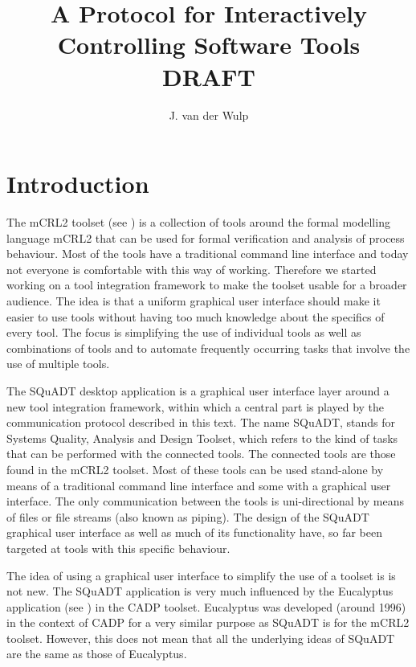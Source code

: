 \documentclass{article}
\title{A Protocol for Interactively Controlling Software Tools\\DRAFT}
\author{J. van der Wulp}
\newcommand{\squadt}{SQuADT\xspace}
\begin{document}
\maketitle
\thispagestyle{empty}

 \section{Introduction}

  The mCRL2 toolset (see \cite{groote_et_al:DSP:2007:862}) is a collection of
  tools around the formal modelling language mCRL2 that can be used for formal
  verification and analysis of process behaviour.  Most of the tools have a
  traditional command line interface and today not everyone is comfortable with
  this way of working.  Therefore we started working on a tool integration
  framework to make the toolset usable for a broader audience. The idea is that
  a uniform graphical user interface should make it easier to use tools without
  having too much knowledge about the specifics of every tool.  The focus is
  simplifying the use of individual tools as well as combinations of tools and
  to automate frequently occurring tasks that involve the use of multiple
  tools.
  
  The \squadt desktop application is a graphical user interface layer around a
  new tool integration framework, within which a central part is played by the
  communication protocol described in this text.  The name \squadt, stands for
  Systems Quality, Analysis and Design Toolset, which refers to the kind of
  tasks that can be performed with the connected tools. The connected tools are
  those found in the mCRL2 toolset. Most of these tools can be used
  stand-alone by means of a traditional command line interface and some with a
  graphical user interface.  The only communication between the tools is
  uni-directional by means of files or file streams (also known as piping). The
  design of the \squadt graphical user interface as well as much of its
  functionality have, so far been targeted at tools with this specific
  behaviour.
  
  The idea of using a graphical user interface to simplify the use of a toolset
  is is not new. The \squadt application is very much influenced by the
  Eucalyptus application (see \cite{CADP}) in the CADP toolset. Eucalyptus was
  developed (around 1996) in the context of CADP for a very similar purpose as
  \squadt is for the mCRL2 toolset. However, this does not mean that all the
  underlying ideas of \squadt are the same as those of Eucalyptus.
  
\end{document}
